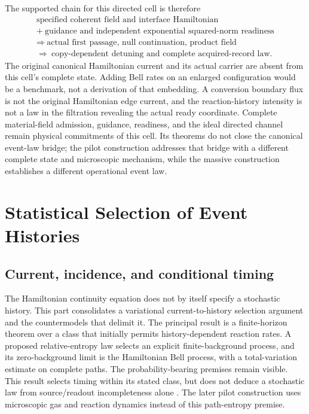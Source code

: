 \documentclass[11pt,oneside,openany]{book}
\theoremstyle{definition}
\theoremstyle{remark}\newtheorem{remark}[theorem]{Remark}
\begin{document}
The supported chain for this directed cell is therefore
\[
 \begin{gathered}
 \text{specified coherent field and interface Hamiltonian}\\
 +\ \text{guidance and independent exponential squared-norm readiness}\\
 \Longrightarrow\ \text{actual first passage, null continuation, product field}\\
 \Longrightarrow\ \text{copy-dependent detuning and complete acquired-record law}.
 \end{gathered}
\]
The original canonical Hamiltonian current and its actual carrier are absent from this cell's complete state. Adding Bell rates on an enlarged configuration would be a benchmark, not a derivation of that embedding. A conversion boundary flux is not the original Hamiltonian edge current, and the reaction-history intensity is not a law in the filtration revealing the actual ready coordinate. Complete material-field admission, guidance, readiness, and the ideal directed channel remain physical commitments of this cell. Its theorems do not close the canonical event-law bridge; the pilot construction addresses that bridge with a different complete state and microscopic mechanism, while the massive construction establishes a different operational event law.


\part{Statistical Selection of Event Histories}\label{part:statistics}

\chapter{Current, incidence, and conditional timing}
\label{stat:current-chapter}

The Hamiltonian continuity equation does not by itself specify a stochastic
history. This part consolidates a variational current-to-history selection
argument and the countermodels that delimit it. The principal result is a
finite-horizon theorem over a class that initially permits history-dependent
reaction rates. A proposed relative-entropy law selects an explicit
finite-background process, and its zero-background limit is the Hamiltonian
Bell process, with a total-variation estimate on complete paths. The
probability-bearing premises remain visible. This result selects timing
within its stated class, but does not deduce a stochastic law from
source/readout incompleteness alone \cite{M30,C03,BellQFT}. The later pilot
construction uses microscopic gas and reaction dynamics instead of this
path-entropy premise.
\end{document}
